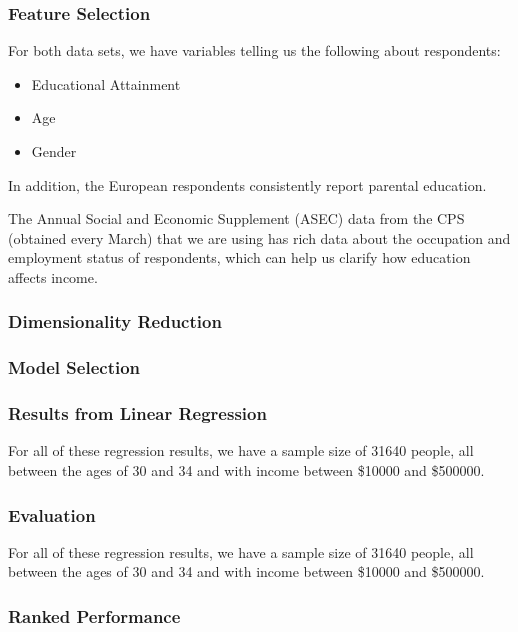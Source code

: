 \documentclass{beamer}
\let\olditem=\item
\renewcommand{\item}{\olditem \justifying}
\begin{document}
\frame %
{
  \frametitle{Feature Selection}
  For both data sets, we have variables telling us the following about respondents:
  \begin{itemize}
  \item Educational Attainment
  \item Age
  \item Gender
  \end{itemize}
  In addition, the European respondents consistently report parental education. 
  
  The Annual Social and Economic Supplement (ASEC) data from the CPS (obtained every March) that we are using has rich data about the occupation and employment status of respondents, which can help us clarify how education affects income.
}


\frame %
{
  \frametitle{Dimensionality Reduction}
  
 
  
  }
  

  

  



\frame %
{
  \frametitle{Model Selection}

  
  
  
  }
  
  \frame %
  {
  \frametitle{Results from Linear Regression}
  \begin{Large}
  
  \end{Large}

\vspace{16pt}

  For all of these regression results, we have a sample size of 31640 people, all between the ages of 30 and 34 and with income between \$10000 and \$500000.
  
  }
  
  \frame %
  {
  \frametitle{Evaluation}
  \begin{Large}
  
  \end{Large}

\vspace{16pt}

  For all of these regression results, we have a sample size of 31640 people, all between the ages of 30 and 34 and with income between \$10000 and \$500000.
  
  }

\frame %
{
  \frametitle{Ranked Performance}
  
}
\end{document}
